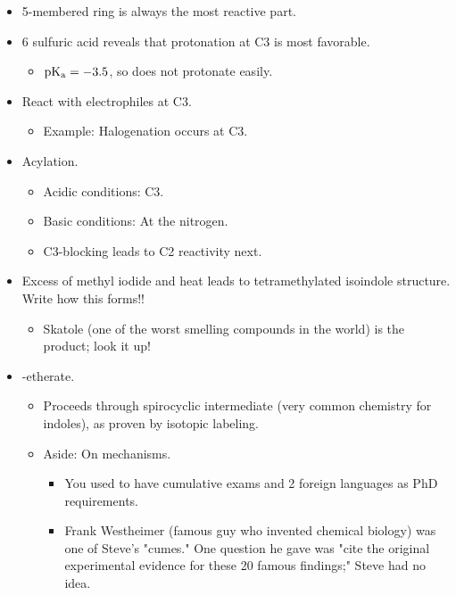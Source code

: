 \documentclass[../notes.tex]{subfiles}
\begin{document}
\begin{itemize}
    \begin{itemize}
        \item 5-membered ring is always the most reactive part.
        \item \SI{6}{\molar} sulfuric acid reveals that protonation at C3 is most favorable.
        \begin{itemize}
            \item $\operatorname{\text{p}K_\text{a}}=-3.5$, so does not protonate easily.
        \end{itemize}
        \item React with electrophiles at C3.
        \begin{itemize}
            \item Example: Halogenation occurs at C3.
        \end{itemize}
        \item Acylation.
        \begin{itemize}
            \item Acidic conditions: C3.
            \item Basic conditions: At the nitrogen.
            \item C3-blocking leads to C2 reactivity next.
        \end{itemize}
        \item Excess of methyl iodide and heat leads to tetramethylated isoindole structure. Write how this forms!!
        \begin{itemize}
            \item Skatole (one of the worst smelling compounds in the world) is the product; look it up!
        \end{itemize}
        \item {}-etherate.
        \begin{itemize}
            \item Proceeds through spirocyclic intermediate (very common chemistry for indoles), as proven by isotopic labeling.
            \item Aside: On mechanisms.
            \begin{itemize}
                \item You used to have cumulative exams and 2 foreign languages as PhD requirements.
                \item Frank Westheimer (famous guy who invented chemical biology) was one of Steve's "cumes." One question he gave was "cite the original experimental evidence for these 20 famous findings;" Steve had no idea.
            \end{itemize}

\end{itemize}
\end{itemize}
\end{itemize}
\end{document}
